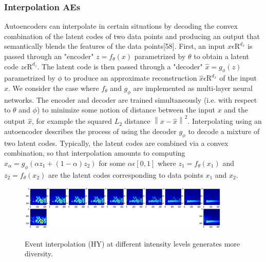 \documentclass[journal]{IEEEtran}
\begin{document}
\subsubsection{Interpolation AEs}
Autoencoders can interpolate in certain situations by decoding the convex combination of the latent codes of two data points and producing an output that semantically blends the features of the data points[58].
First, an input $x\epsilon\mathrm{R}^{d_x}$ is passed through an "encoder" $z=f_\theta(x)$ parametrized by $\theta$ to obtain a latent code $z\epsilon\mathrm{R}^{d_z}$. The latent code is then passed through a "decoder" $\hat{x}=g_\phi(z)$ parametrized by $\phi$ to produce an approximate reconstruction $\hat{x}\epsilon\mathrm{R}^{d_x}$ of the input $x$. We consider the case where $f_\theta$ and $g_\phi$ are implemented as multi-layer neural networks. The encoder and decoder are trained simultaneously (i.e. with respect to $\theta$ and $\phi$) to minimize some notion of distance between the input $x$ and the output $\hat{x}$, for example the squared $L_2$ distance $\left\|x-\hat{x}\right\|^2$.
Interpolating using an autoencoder describes the process of using the decoder $g_\phi$ to decode a mixture of two latent codes. Typically, the latent codes are combined via a convex combination, so that interpolation amounts to computing $x_\alpha=g_\phi(\alpha z_1+(1-\alpha) z_2)$ for some $\alpha\epsilon[0,1]$ where $z_1=f_\theta(x_1)$ and $z_2=f_\theta(x_2)$ are the latent codes corresponding to data points $x_1$ and $x_2$.
\begin{figure}
\centering
{\includegraphics[width=0.9\textwidth,keepaspectratio]{img/da_interpolacion.png}}
\caption{Event interpolation (HY) at different intensity levels generates more diversity.}
\label{fig:da_interpolation}
\end{figure}
\end{document}
